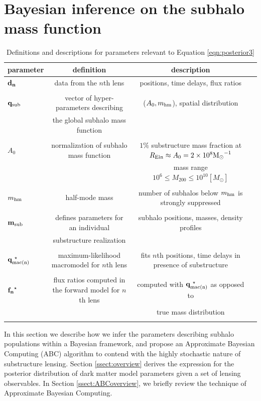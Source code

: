 \section{Bayesian inference on the subhalo mass function}
\label{sec:ABC}
\begin{landscape}
\begin{table}
	\centering
	\caption{Definitions and descriptions for parameters relevant to Equation \ref{eqn:posterior3}}
	\label{tab:notation}
	\begin{tabular}{lccr} %
		\hline
		parameter & definition & description\\
		\hline
		$\bf{d}_n$ & data from the $n$th lens & positions, time delays, flux ratios \\ \\ 
		${\bf{q}_{\rm{sub}}}$ & vector of hyper-parameters  describing & ($A_0,m_{\rm{hm}}$), spatial distribution \\ & the global subhalo mass function \\ \\ 
		$A_0$ & normalization of subhalo mass function & $1\%$ substructure mass fraction at $R_{\rm{Ein}} \approx A_0 = 2 \times 10^8 {\rm{M}_{\odot}}^{-1}$ \\ & & mass range $10^6 \leq M_{200} \leq 10^{10} \left[M_{\odot} \right]$ \\ \\
		$m_{\rm{hm}}$ & half-mode mass & number of subhalos below $m_{\rm{hm}}$ is strongly suppressed\\ \\
		${\bf{m}_{\rm{sub}}}$ & defines parameters for an individual & subhalo positions, masses, density profiles\\ & substructure realization & & \\ \\ 
		${\bf{q}_{\rm{mac(n)}}^{\ \star}}$ & maximum-likelihood macromodel for $n$th lens& fits $n$th positions, time delays in presence of substructure\\ \\
		${\bf{f_n}^{\star}}$ & flux ratios computed in the forward model for $n$th lens& computed with ${\bf{q}_{\rm{mac(n)}}^{\ \star}}$ as opposed to\\ & & true mass distribution \\ \\
		\hline		
	\end{tabular}
\end{table}
\end{landscape}

In this section we describe how we infer the parameters describing subhalo populations within a Bayesian framework, and propose an Approximate Bayesian Computing (ABC) algorithm to contend with the highly stochastic nature of substructure lensing. Section \ref{ssect:overview} derives the expression for the posterior distribution of dark matter model parameters given a set of lensing observables. In Section \ref{ssect:ABCoverview}, we briefly review the technique of Approximate Bayesian Computing.

